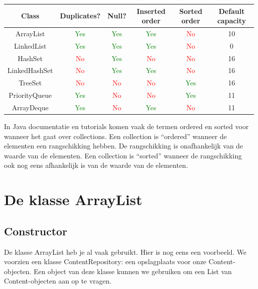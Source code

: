 \documentclass{tstextbook}
\begin{document}
\begin{tabular}{|c|c|c|c|c|c|}
\hline
Class & Duplicates? & Null? & Inserted order & Sorted order & Default capacity \\
\hline
ArrayList & \textcolor{green}{Yes} & \textcolor{green}{Yes} &\textcolor{green}{Yes} & \textcolor{red}{No} & 10 \\
LinkedList & \textcolor{green}{Yes} & \textcolor{green}{Yes} &\textcolor{green}{Yes} & \textcolor{red}{No} & 0 \\
HashSet & \textcolor{red}{No} & \textcolor{green}{Yes} &\textcolor{red}{No} & \textcolor{red}{No} & 16 \\
LinkedHashSet & \textcolor{red}{No} & \textcolor{green}{Yes} & \textcolor{green}{Yes}& \textcolor{red}{No} & 16 \\
TreeSet & \textcolor{red}{No} & \textcolor{red}{No} & \textcolor{red}{No} & \textcolor{green}{Yes} & 16 \\
PriorityQueue & \textcolor{green}{Yes} & \textcolor{red}{No} & \textcolor{red}{No} & \textcolor{green}{Yes} & 11 \\
ArrayDeque & \textcolor{green}{Yes} & \textcolor{red}{No} & \textcolor{green}{Yes} & \textcolor{red}{No} & 11 \\
\hline
\end{tabular}
\vspace{4mm}

In Java documentatie en tutorials komen vaak de termen ordered en sorted voor wanneer het gaat over collections. Een collection is ``ordered'' wanneer de elementen een rangschikking hebben. De rangschikking is onafhankelijk van de waarde van de elementen. Een collection is ``sorted'' wanneer de rangschikking ook nog eens afhankelijk is van de waarde van de elementen. 

\section{De klasse ArrayList}

\subsection{Constructor}

De klasse ArrayList heb je al vaak gebruikt. Hier is nog eens een voorbeeld.
We voorzien een klasse ContentRepository: een opslagplaats voor onze Content-objecten. Een object van deze klasse kunnen we gebruiken om een List van Content-objecten aan op te vragen.
\end{document}
